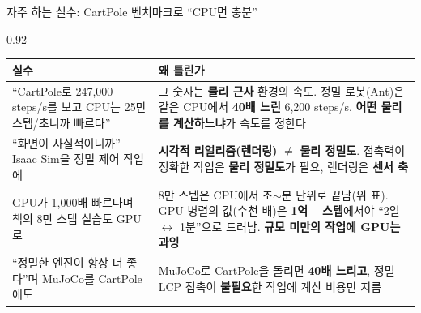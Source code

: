 \begin{frame}{자주 하는 실수: CartPole 벤치마크로 ``CPU면 충분''}
\begin{center}\begin{varwidth}{0.92\textwidth}
  \small
  \begin{tabular}{@{}p{4.8cm}p{9.2cm}@{}}
    \toprule
    실수 & 왜 틀린가 \\
    \midrule
    ``CartPole로 247,000 steps/s를 보고 CPU는 25만 스텝/초니까
      빠르다'' & 그 숫자는 \textbf{물리 근사} 환경의 속도. 정밀
      로봇(Ant)은 같은 CPU에서 \textbf{40배 느린} 6,200 steps/s.
      \textbf{어떤 물리를 계산하느냐}가 속도를 정한다 \\
    ``화면이 사실적이니까'' Isaac Sim을 정밀 제어 작업에 &
      \textbf{시각적 리얼리즘(렌더링)} $\neq$ \textbf{물리
      정밀도}. 접촉력이 정확한 작업은 \textbf{물리 정밀도}가
      필요, 렌더링은 \textbf{센서 축} \\
    GPU가 1,000배 빠르다며 책의 8만 스텝 실습도 GPU로 & 8만
      스텝은 CPU에서 초$\sim$분 단위로 끝남(위 표). GPU 병렬의
      값(수천 배)은 \textbf{1억+ 스텝}에서야 ``2일 $\leftrightarrow$
      1분''으로 드러남. \textbf{규모 미만의 작업에 GPU는 과잉} \\
    ``정밀한 엔진이 항상 더 좋다''며 MuJoCo를 CartPole에도 &
      MuJoCo로 CartPole을 돌리면 \textbf{40배 느리고}, 정밀 LCP
      접촉이 \textbf{불필요}한 작업에 계산 비용만 지름 \\
    \bottomrule
  \end{tabular}
\end{varwidth}\end{center}
\end{frame}
